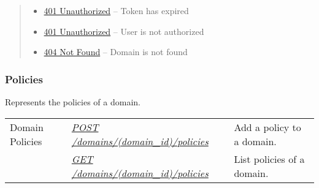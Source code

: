 \documentclass[letterpaper,10pt,english]{sphinxmanual}
\begin{document}
\begin{fulllineitems}
\begin{quote}
\begin{description}
\begin{itemize}
\item {} 
\href{http://www.w3.org/Protocols/rfc2616/rfc2616-sec10.html\#sec10.4.2}{401 Unauthorized} -- Token has expired

\item {} 
\href{http://www.w3.org/Protocols/rfc2616/rfc2616-sec10.html\#sec10.4.2}{401 Unauthorized} -- User is not authorized

\item {} 
\href{http://www.w3.org/Protocols/rfc2616/rfc2616-sec10.html\#sec10.4.5}{404 Not Found} -- Domain is not found

\end{itemize}

\end{description}\end{quote}

\end{fulllineitems}



\subsubsection{Policies}
\label{\detokenize{resources/domain:policies}}
Represents the policies of a domain.

\noindent\begin{tabulary}{\linewidth}{|L|L|L|}
\hline
{}\relax &\relax &\relax \\
\hline
Domain Policies
&
{\hyperref[\detokenize{resources/domain:post--domains-(domain_id)-policies}]{\emph{POST /domains/(domain\_id)/policies}}}
&
Add a policy to a domain.
\\
\hline&
{\hyperref[\detokenize{resources/domain:get--domains-(domain_id)-policies}]{\emph{GET /domains/(domain\_id)/policies}}}
&
List policies of a domain.
\\
\hline\end{tabulary}


\begin{DUlineblock}{0em}
\item[] 
\end{DUlineblock}
\end{document}
